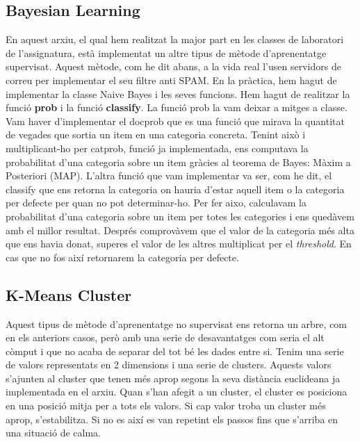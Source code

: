 \documentclass[11pt]{article}
\begin{document}
	\subsection{Bayesian Learning}
		En aquest arxiu, el qual hem realitzat la major part en les classes de laboratori de l'assignatura,  està implementat un altre tipus de mètode d'aprenentatge supervisat. Aquest mètode, com he dit abans, a la vida real l'usen servidors de correu per implementar el seu filtre anti SPAM. En la pràctica, hem hagut de implementar la classe Naive Bayes i les seves funcions. Hem hagut de realitzar la funció \textbf{prob }i la funció \textbf{classify}. La funció prob la vam deixar a mitges a classe. Vam haver d'implementar el docprob que es una funció que mirava la quantitat de vegades que sortia un item en una categoria concreta. Tenint això i multiplicant-ho per catprob, funció ja implementada, ens computava la probabilitat d'una categoria sobre un item gràcies al teorema de Bayes: Màxim a Posteriori (MAP). L'altra funció que vam implementar va ser, com he dit, el classify que ens retorna la categoria on hauria d'estar aquell item o la categoria per defecte per quan no pot determinar-ho. Per fer aixo, calculavam la probabilitat d'una categoria sobre un item per totes les categories i ens quedàvem amb el millor resultat. Després comprovàvem que el valor de la categoria més alta que ens havia donat, superes el valor de les altres multiplicat per el \textit{threshold}. En cas que no fos així retornarem la categoria per defecte.
	\subsection{K-Means Cluster}
		Aquest tipus de mètode d'aprenentatge no supervisat ens retorna un arbre, com en els anteriors casos, però amb una serie de desavantatges com seria el alt còmput i que no acaba de separar del tot bé les dades entre si. Tenim una serie de valors representats en 2 dimensions i una serie de clusters. Aquests valors s'ajunten al cluster que tenen més aprop segons la seva distància euclideana ja implementada en el arxiu. Quan s'han afegit a un cluster, el cluster es posiciona en una posició mitja per a tots els valors. Si cap valor troba un cluster més aprop, s'estabilitza. Si no es així es van repetint els passos fins que s'arriba en una situació de calma.  
\end{document}
